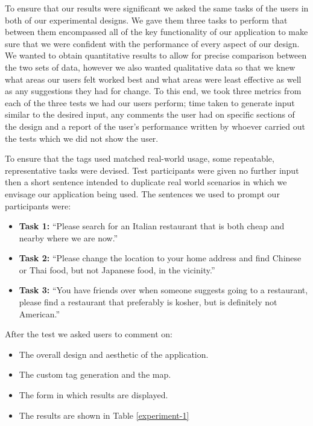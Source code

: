 \documentclass[10pt,a4paper]{article}
\begin{document}
To ensure that our results were significant we asked the same tasks of the users in both of our experimental designs. We gave them three tasks to perform that between them encompassed all of the key functionality of our application to make sure that we were confident with the performance of every aspect of our design. We wanted to obtain quantitative results to allow for precise comparison between the two sets of data, however we also wanted qualitative data so that we knew what areas our users felt worked best and what areas were least effective as well as any suggestions they had for change. To this end, we took three metrics from each of the three tests we had our users perform; time taken to generate input similar to the desired input, any comments the user had on specific sections of the design and a report of the user’s performance written by whoever carried out the tests which we did not show the user.

To ensure that the tags used matched real-world usage, some repeatable, representative tasks were devised. Test participants were given no further input then a short sentence intended to duplicate real world scenarios in which we envisage our application being used. The sentences we used to prompt our participants were:


\begin{itemize}
\item \textbf{Task 1:} “Please search for an Italian restaurant that is both cheap and nearby where we are now.”
\item \textbf{Task 2:} “Please change the location to your home address and find Chinese or Thai food, but not Japanese food, in the vicinity.”
\item \textbf{Task 3:} “You have friends over when someone suggests going to a restaurant, please find a restaurant that preferably is kosher, but is definitely not American.”
\end{itemize}

After the  test we asked users to comment on:

\begin{itemize}
\item The overall design and aesthetic of the application.
\item The custom tag generation and the map.
\item The form in which results are displayed.
\item The results are shown in Table \ref{experiment-1}
\end{itemize}
\end{document}
